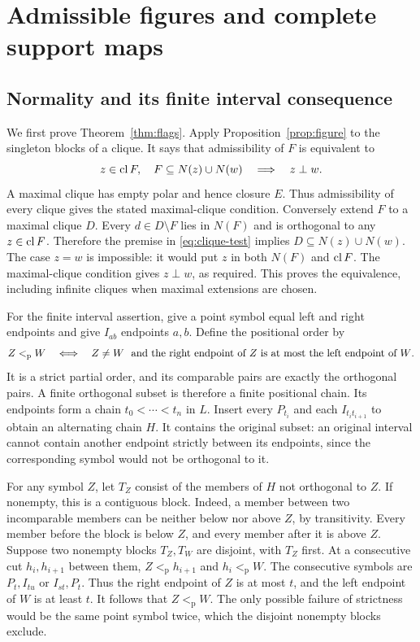 \section{Admissible figures and complete support maps}
\label{sec:figure-comparisons}

\subsection{Normality and its finite interval consequence}
We first prove Theorem~\ref{thm:flags}. Apply
Proposition~\ref{prop:figure} to the singleton blocks of a clique.
It says that admissibility of $F$ is equivalent to
\begin{equation}\label{eq:clique-test}
 z\in\operatorname{cl} F,\quad F\subseteq N(z)\cup N(w)
 \quad\Longrightarrow\quad z\perp w.
\end{equation}
A maximal clique has empty polar and hence closure $E$. Thus
admissibility of every clique gives the stated maximal-clique
condition. Conversely extend $F$ to a maximal clique $D$. Every
$d\in D\setminus F$ lies in $N(F)$ and is orthogonal to any
$z\in\operatorname{cl} F$. Therefore the premise in \eqref{eq:clique-test}
implies $D\subseteq N(z)\cup N(w)$. The case $z=w$ is impossible:
it would put $z$ in both $N(F)$ and $\operatorname{cl} F$. The maximal-clique
condition gives $z\perp w$, as required. This proves the equivalence,
including infinite cliques when maximal extensions are chosen.

For the finite interval assertion, give a point symbol equal left
and right endpoints and give $I_{ab}$ endpoints $a,b$. Define the
positional order by
\[
 Z<_{\mathrm p}W\quad\Longleftrightarrow\quad
 Z\ne W\ \hbox{ and the right endpoint of $Z$ is at most the
 left endpoint of $W$}.
\]
It is a strict partial order, and its comparable pairs are exactly
the orthogonal pairs. A finite orthogonal subset is therefore a
finite positional chain. Its endpoints form a chain
$t_0<\cdots<t_n$ in $L$. Insert every $P_{t_i}$ and each
$I_{t_it_{i+1}}$ to obtain an alternating chain $H$. It contains
the original subset: an original interval cannot contain another
endpoint strictly between its endpoints, since the corresponding
symbol would not be orthogonal to it.

For any symbol $Z$, let $T_Z$ consist of the members of $H$ not
orthogonal to $Z$. If nonempty, this is a contiguous block.
Indeed, a member between two incomparable members can be neither
below nor above $Z$, by transitivity. Every member before the block
is below $Z$, and every member after it is above $Z$.
Suppose two nonempty blocks $T_Z,T_W$ are disjoint, with $T_Z$
first. At a consecutive cut $h_i,h_{i+1}$ between them,
$Z<_{\mathrm p}h_{i+1}$ and $h_i<_{\mathrm p}W$.
The consecutive symbols are $P_t,I_{tu}$ or $I_{st},P_t$.
Thus the right endpoint of $Z$ is at most $t$, and the left
endpoint of $W$ is at least $t$. It follows that
$Z<_{\mathrm p}W$. The only possible failure of strictness would
be the same point symbol twice, which the disjoint nonempty
blocks exclude.

